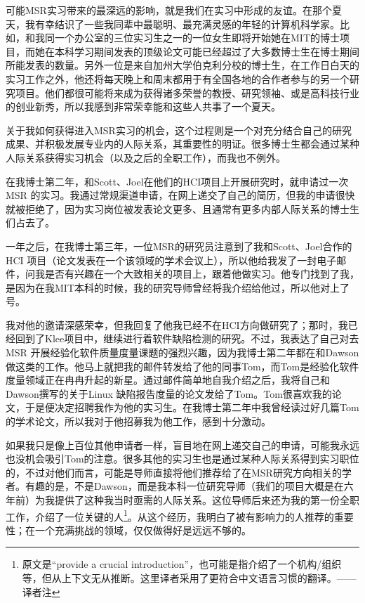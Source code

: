 \documentclass[letter,12pt]{book}
\begin{document}
\begin{CJK}{UTF8}{gbsn}
可能MSR实习带来的最深远的影响，就是我们在实习中形成的友谊。在那个夏天，我有幸结识了一些我同辈中最聪明、最充满灵感的年轻的计算机科学家。比如，和我同一个办公室的三位实习生之一的一位女生即将开始她在MIT的博士项目，而她在本科学习期间发表的顶级论文可能已经超过了大多数博士生在博士期间所能发表的数量。另外一位是来自加州大学伯克利分校的博士生，在工作日白天的实习工作之外，他还将每天晚上和周末都用于有全国各地的合作者参与的另一个研究项目。他们都很可能将来成为获得诸多荣誉的教授、研究领袖、或是高科技行业的创业新秀，所以我感到非常荣幸能和这些人共事了一个夏天。

\breakline

关于我如何获得进入MSR实习的机会，这个过程则是一个对充分结合自己的研究成果、并积极发展专业内的人际关系，其重要性的明证。很多博士生都会通过某种人际关系获得实习机会（以及之后的全职工作），而我也不例外。

在我博士第二年，和Scott、Joel在他们的HCI项目上开展研究时，就申请过一次MSR 的实习。我通过常规渠道申请，在网上递交了自己的简历，但我的申请很快就被拒绝了，因为实习岗位被发表论文更多、且通常有更多内部人际关系的博士生们占去了。

一年之后，在我博士第三年，一位MSR的研究员注意到了我和Scott、Joel合作的HCI 项目（论文发表在一个该领域的学术会议上），所以他给我发了一封电子邮件，问我是否有兴趣在一个大致相关的项目上，跟着他做实习。他专门找到了我，是因为在我MIT本科的时候，我的研究导师曾经将我介绍给他过，所以他对上了号。

我对他的邀请深感荣幸，但我回复了他我已经不在HCI方向做研究了；那时，我已经回到了Klee项目中，继续进行着软件缺陷检测的研究。不过，我表达了自己对去MSR 开展经验化软件质量度量课题的强烈兴趣，因为我博士第二年都在和Dawson做这类的工作。他马上就把我的邮件转发给了他的同事Tom，而Tom是经验化软件度量领域正在冉冉升起的新星。通过邮件简单地自我介绍之后，我将自己和Dawson撰写的关于Linux 缺陷报告度量的论文发给了Tom。Tom很喜欢我的论文，于是便决定招聘我作为他的实习生。在我博士第二年中我曾经读过好几篇Tom的学术论文，所以我对于他招募我为他工作，感到十分激动。

如果我只是像上百位其他申请者一样，盲目地在网上递交自己的申请，可能我永远也没机会吸引Tom的注意。很多其他的实习生也是通过某种人际关系得到实习职位的，不过对他们而言，可能是导师直接将他们推荐给了在MSR研究方向相关的学者。有趣的是，不是Dawson，而是我本科一位研究导师（我们的项目大概是在六年前）为我提供了这种我当时亟需的人际关系。这位导师后来还为我的第一份全职工作，介绍了一位关键的人\footnote{原文是``provide a crucial introduction''，也可能是指介绍了一个机构/组织等，但从上下文无从推断。这里译者采用了更符合中文语言习惯的翻译。——译者注}。从这个经历，我明白了被有影响力的人推荐的重要性；在一个充满挑战的领域，仅仅做得好是远远不够的。


\end{CJK}
\end{document}
